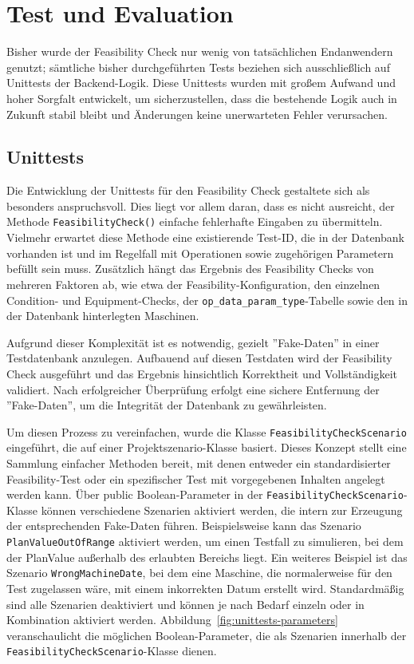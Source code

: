\chapter{Test und Evaluation}

Bisher wurde der Feasibility Check nur wenig von tatsächlichen Endanwendern genutzt; sämtliche bisher durchgeführten Tests beziehen sich ausschließlich auf Unittests der Backend-Logik. Diese Unittests wurden mit großem Aufwand und hoher Sorgfalt entwickelt, um sicherzustellen, dass die bestehende Logik auch in Zukunft stabil bleibt und Änderungen keine unerwarteten Fehler verursachen.

\section{Unittests}

Die Entwicklung der Unittests für den Feasibility Check gestaltete sich als besonders anspruchsvoll. Dies liegt vor allem daran, dass es nicht ausreicht, der Methode \texttt{FeasibilityCheck()} einfache fehlerhafte Eingaben zu übermitteln. Vielmehr erwartet diese Methode eine existierende Test-ID, die in der Datenbank vorhanden ist und im Regelfall mit Operationen sowie zugehörigen Parametern befüllt sein muss. Zusätzlich hängt das Ergebnis des Feasibility Checks von mehreren Faktoren ab, wie etwa der Feasibility-Konfiguration, den einzelnen Condition- und Equipment-Checks, der \texttt{op\_data\_param\_type}-Tabelle sowie den in der Datenbank hinterlegten Maschinen.

Aufgrund dieser Komplexität ist es notwendig, gezielt ''Fake-Daten'' in einer Testdatenbank anzulegen. Aufbauend auf diesen Testdaten wird der Feasibility Check ausgeführt und das Ergebnis hinsichtlich Korrektheit und Vollständigkeit validiert. Nach erfolgreicher Überprüfung erfolgt eine sichere Entfernung der ''Fake-Daten'', um die Integrität der Datenbank zu gewährleisten.

Um diesen Prozess zu vereinfachen, wurde die Klasse \texttt{FeasibilityCheckScenario} eingeführt, die auf einer Projektszenario-Klasse basiert. Dieses Konzept stellt eine Sammlung einfacher Methoden bereit, mit denen entweder ein standardisierter Feasibility-Test oder ein spezifischer Test mit vorgegebenen Inhalten angelegt werden kann. Über public Boolean-Parameter in der \texttt{FeasibilityCheckScenario}-Klasse können verschiedene Szenarien aktiviert werden, die intern zur Erzeugung der entsprechenden Fake-Daten führen. Beispielsweise kann das Szenario \texttt{PlanValueOutOfRange} aktiviert werden, um einen Testfall zu simulieren, bei dem der PlanValue außerhalb des erlaubten Bereichs liegt. Ein weiteres Beispiel ist das Szenario \texttt{WrongMachineDate}, bei dem eine Maschine, die normalerweise für den Test zugelassen wäre, mit einem inkorrekten Datum erstellt wird. Standardmäßig sind alle Szenarien deaktiviert und können je nach Bedarf einzeln oder in Kombination aktiviert werden. Abbildung~\ref{fig:unittests-parameters} veranschaulicht die möglichen Boolean-Parameter, die als Szenarien innerhalb der \texttt{FeasibilityCheckScenario}-Klasse dienen.

